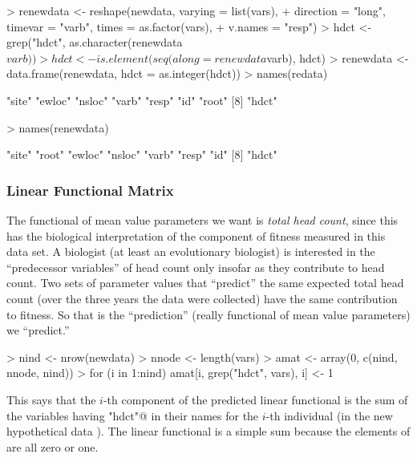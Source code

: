 \documentclass[11pt]{article}
\begin{document}
\begin{Schunk}
\begin{Sinput}
> renewdata <- reshape(newdata, varying = list(vars), 
+     direction = "long", timevar = "varb", times = as.factor(vars), 
+     v.names = "resp")
> hdct <- grep("hdct", as.character(renewdata$varb))
> hdct <- is.element(seq(along = renewdata$varb), hdct)
> renewdata <- data.frame(renewdata, hdct = as.integer(hdct))
> names(redata)
\end{Sinput}
\begin{Soutput}
[1] "site"  "ewloc" "nsloc" "varb"  "resp"  "id"    "root" 
[8] "hdct" 
\end{Soutput}
\begin{Sinput}
> names(renewdata)
\end{Sinput}
\begin{Soutput}
[1] "site"  "root"  "ewloc" "nsloc" "varb"  "resp"  "id"   
[8] "hdct" 
\end{Soutput}
\end{Schunk}

\subsubsection{Linear Functional Matrix}

The functional of mean value parameters we want is \emph{total head count},
since this has the biological interpretation of the component of fitness
measured in this data set.  A biologist (at least an evolutionary biologist)
is interested in the ``predecessor variables'' of head count only insofar
as they contribute to head count.  Two sets of parameter values that
``predict'' the same expected total head count (over the three years the
data were collected) have the same contribution to fitness.  So that is
the ``prediction'' (really functional of mean value parameters) we ``predict.''
\begin{Schunk}
\begin{Sinput}
> nind <- nrow(newdata)
> nnode <- length(vars)
> amat <- array(0, c(nind, nnode, nind))
> for (i in 1:nind) amat[i, grep("hdct", vars), i] <- 1
\end{Sinput}
\end{Schunk}
This says that the $i$-th component of the predicted linear functional
is the sum of the variables having \verb@"hdct"@ in their names for the
$i$-th individual (in the new hypothetical data \verb@newdata@).  The
linear functional is a simple sum because the elements of \verb@amat@
are all zero or one.
\end{document}
